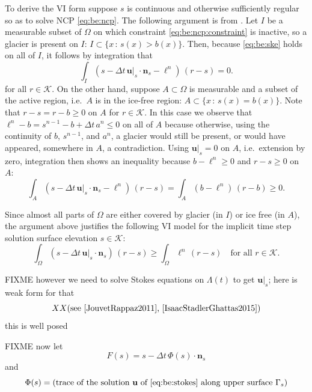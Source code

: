 \documentclass[hidelinks,onefignum,onetabnum,final]{siamart220329}  %
\newcommand{\bn}{\mathbf{n}}
\newcommand{\bu}{\mathbf{u}}
\newcommand{\cK}{\mathcal{K}}
\begin{document}
To derive the VI form suppose $s$ is continuous and otherwise sufficiently regular so as to solve NCP \eqref{eq:be:ncp}.  The following argument is from \cite{Bueler2021conservation}.  Let $I$ be a measurable subset of $\Omega$ on which constraint \eqref{eq:be:ncp:constraint} is inactive, so a glacier is present on $I$: $I \subset \{x\,:\,s(x)>b(x)\}$.    Then, because \eqref{eq:be:ske} holds on all of $I$, it follows by integration that
\begin{equation}
\int_I \left(s - \Delta t\,\bu|_s \cdot \bn_s - \ell^n\right)\,(r-s) = 0.
\end{equation}
for all $r\in\cK$.  On the other hand, suppose $A \subset \Omega$ is measurable and a subset of the active region, i.e.~$A$ is in the ice-free region: $A \subset \{x\,:\,s(x)=b(x)\}$.  Note that $r-s=r-b\ge 0$ on $A$ for $r\in\cK$.  In this case we observe that $\ell^n - b = s^{n-1} - b + \Delta t\,a^n\le 0$ on all of $A$ because otherwise, using the continuity of $b$, $s^{n-1}$, and $a^n$, a glacier would still be present, or would have appeared, somewhere in $A$, a contradiction.  Using $\bu|_s=0$ on $A$, i.e.~extension by zero, integration then shows an inequality because $b-\ell^n \ge 0$ and $r-s\ge 0$ on $A$:
\begin{equation}
\int_A \left(s - \Delta t\,\bu|_s \cdot \bn_s - \ell^n\right)\,(r-s) = \int_A \left(b - \ell^n\right)\,(r-b) \ge 0.
\end{equation}

Since almost all parts of $\Omega$ are either covered by glacier (in $I$) or ice free (in $A$), the argument above justifies the following VI model for the implicit time step solution surface elevation $s \in \cK$:
\begin{equation}
\int_\Omega \left(s - \Delta t\,\bu|_s \cdot \bn_s\right)\,(r-s) \ge \int_\Omega \ell^n \,(r-s) \quad \text{for all } r \in \cK. \label{eq:be:viearly}
\end{equation}
	
FIXME however we need to solve Stokes equations on $\Lambda(t)$ to get $\bu|_s$; here is weak form for that
\begin{equation}
XX \text{(see \cite{JouvetRappaz2011}, \cite{IsaacStadlerGhattas2015})} \label{eq:be:stokes}
\end{equation}
this is well posed \cite{JouvetRappaz2011}

FIXME now let
\begin{equation}
F(s) = s - \Delta t\,\Phi(s) \cdot \bn_s  \label{eq:be:Fdefine}
\end{equation}
and
\begin{equation}
\Phi(s) = \left(\text{trace of the solution $\bu$ of \eqref{eq:be:stokes} along upper surface $\Gamma_s$}\right)  \label{eq:be:Phidefine}
\end{equation}
\end{document}
